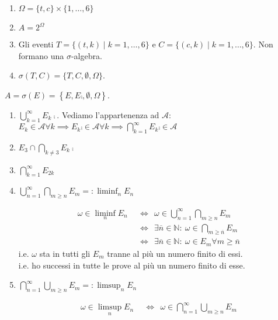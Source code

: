 \Soluzione

\begin{enumerate}
	\item $\Omega =\{t,c\} \times \{1,\dots ,6\}$
	\item $A=2^{\Omega }$
	\item Gli eventi $T=\{( t,k) \mid k=1,\dots ,6\}$ e $C=\{( c,k) \mid k=1,\dots ,6\}$. Non formano una $\sigma $-algebra.
	\item $\sigma ( T,C) =\{T,C,\emptyset ,\Omega \}$.
\end{enumerate}

\Soluzione

$A=\sigma ( E) =\left\{E,E\comp ,\emptyset ,\Omega \right\}$.

\Soluzione

\begin{enumerate}
	\item $\bigcup\limits _{k=1}^{\infty } E_{k}\comp$. Vediamo l'appartenenza ad $\mathcal{A}$: $E_{k} \in \mathcal{A} \forall k\implies  E_{k}\comp \in \mathcal{A} \forall k\implies  \bigcap\limits _{k=1}^{\infty } E_{k}\comp \in \mathcal{A}$
	\item $E_{3} \cap \bigcap\limits _{k\neq 3} E_{k}\comp$
	\item $\bigcap\limits _{k=1}^{\infty } E_{2k}$
	\item $\bigcup\limits _{n=1}^{\infty }\bigcap\limits _{m\geq n} E_{m} =:\liminf _{n} E_{n}$
	\begin{oss}
		\begin{align*}
			\omega \in \liminf _{n} E_{n} & \ \ \iff \ \ \omega \in \bigcup _{n=1}^{\infty }\bigcap _{m\geq n} E_{m}\\
			 & \ \ \iff \ \ \exists \overline{n} \in \mathbb{N} :\ \omega \in \bigcap _{m\geq \overline{n}} E_{m}\\
			 & \ \ \iff \ \ \exists \overline{n} \in \mathbb{N} :\ \omega \in E_{m} \forall m\geq \overline{n}
		\end{align*}
		i.e. $\omega $ sta in tutti gli $E_{m}$ tranne al più un numero finito di essi.\\
		i.e. ho successi in tutte le prove al più un numero finito di esse.
	\end{oss}
	\item $\bigcap\limits _{n=1}^{\infty }\bigcup\limits _{m\geq n} E_{m} =:\limsup _{n} E_{n}$
	\begin{oss}
		\begin{align*}
			\omega \in \limsup _{n} E_{n} & \ \ \iff \ \ \omega \in \bigcap _{n=1}^{\infty }\bigcup _{m\geq n} E_{m}\\

\end{align*}
\end{oss}
\end{enumerate}
